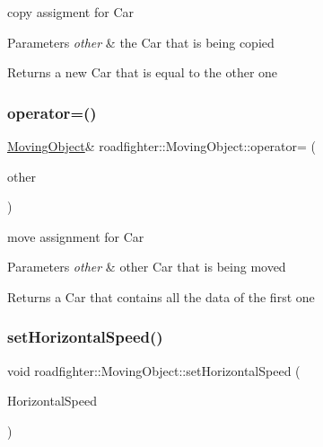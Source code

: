 copy assigment for Car 
\begin{DoxyParams}{Parameters}
{\em other} & the Car that is being copied \\
\hline
\end{DoxyParams}
\begin{DoxyReturn}{Returns}
a new Car that is equal to the other one 
\end{DoxyReturn}
\mbox{\label{classroadfighter_1_1MovingObject_ae2150a0937d9e1b978bcdf2ba1628677}} 
\subsubsection{\texorpdfstring{operator=()}{operator=()}\hspace{0.1cm}{\footnotesize\ttfamily [2/2]}}
{\footnotesize\ttfamily \hyperlink{classroadfighter_1_1MovingObject}{Moving\+Object}\& roadfighter\+::\+Moving\+Object\+::operator= (\begin{DoxyParamCaption}\item[{\hyperlink{classroadfighter_1_1MovingObject}{Moving\+Object} \&\&}]{other }\end{DoxyParamCaption})\hspace{0.3cm}{\ttfamily [default]}}

move assignment for Car 
\begin{DoxyParams}{Parameters}
{\em other} & other Car that is being moved \\
\hline
\end{DoxyParams}
\begin{DoxyReturn}{Returns}
a Car that contains all the data of the first one 
\end{DoxyReturn}
\mbox{\label{classroadfighter_1_1MovingObject_a20321fab6dfee452486f80d744d7002d}} 
\subsubsection{\texorpdfstring{set\+Horizontal\+Speed()}{setHorizontalSpeed()}}
{\footnotesize\ttfamily void roadfighter\+::\+Moving\+Object\+::set\+Horizontal\+Speed (\begin{DoxyParamCaption}\item[{double}]{Horizontal\+Speed }\end{DoxyParamCaption})}

